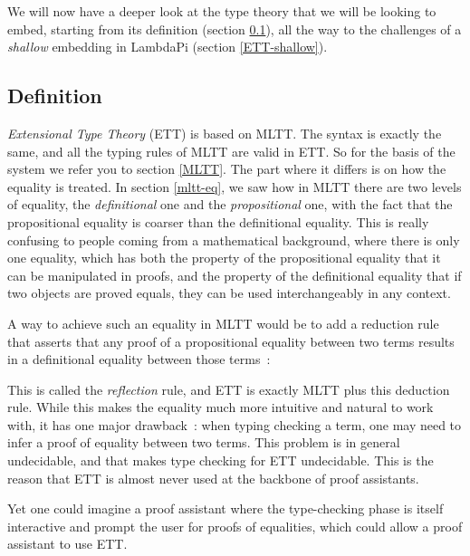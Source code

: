 
We will now have a deeper look at the type theory that we will be looking to
embed, starting from its definition (section \ref{ETT-def}), all the way to the
challenges of a \emph{shallow} embedding in LambdaPi (section
\ref{ETT-shallow}).

\subsection{Definition}\label{ETT-def}

\emph{Extensional Type Theory} (ETT) is based on MLTT. The syntax is exactly
the same, and all the typing rules of MLTT are valid in ETT. So for the basis
of the system we refer you to section \ref{MLTT}. The part where it differs is
on how the equality is treated. In section \ref{mltt-eq}, we saw how in MLTT
there are two levels of equality, the \emph{definitional} one and the
\emph{propositional} one, with the fact that the propositional equality is
coarser than the definitional equality. This is really confusing to people
coming from a mathematical background, where there is only one equality, which
has both the property of the propositional equality that it can be manipulated
in proofs, and the property of the definitional equality that if two objects
are proved equals, they can be used interchangeably in any context.

A way to achieve such an equality in MLTT would be to add a reduction rule that
asserts that any proof of a propositional equality between two terms results in
a definitional equality between those terms~:

\begin{center}\begin{prooftree}
\end{prooftree}\end{center}

This is called the \emph{reflection} rule, and ETT is exactly MLTT plus this
deduction rule. While this makes the equality much more intuitive and natural
to work with, it has one major drawback~: when typing checking a term, one may
need to infer a proof of equality between two terms. This problem is in general
undecidable, and that makes type checking for ETT undecidable. This is the
reason that ETT is almost never used at the backbone of proof assistants.

Yet one could imagine a proof assistant where the type-checking phase is itself
interactive and prompt the user for proofs of equalities, which could allow a
proof assistant to use ETT.

